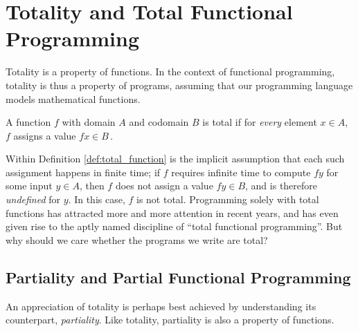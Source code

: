 


\section{Totality and Total Functional Programming}
\label{sec:totality}
Totality is a property of functions. In the context of functional programming,
totality is thus a property of programs, assuming that our programming language
models mathematical functions. 

\begin{definition}
\label{def:total_function}
A function $f$ with domain $A$ and codomain $B$ is total if for \emph{every}
element $x\in A$, $f$ assigns a value
$f x\in B$\,\citep{Turner04totalfunctional}.
\end{definition}

Within Definition \ref{def:total_function} is the implicit assumption that each
such assignment happens in finite time; if $f$ requires infinite time to compute
$f y$ for some input $y\in A$, then $f$ does not assign a value $f y\in B$, and is
therefore \emph{undefined} for $y$. In this case, $f$ is not total. Programming
solely with total functions has attracted more and more attention in recent
years, and has even given rise to the aptly named discipline of ``total
functional programming''. But why should we care whether the programs we write
are total?

\subsection{Partiality and Partial Functional Programming}
An appreciation of totality is perhaps best achieved by understanding its
counterpart, \emph{partiality}. Like totality, partiality is also a property of
functions. 

